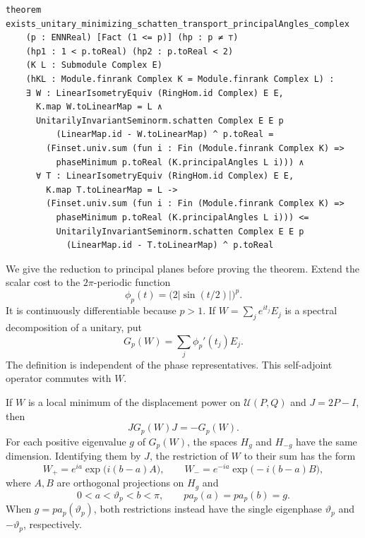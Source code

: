 \begin{lstlisting}[style=leanpaper,
 caption={Lean signature for the unrestricted Schatten minimum. The surrounding
 finite-dimensional complex Hilbert-space context is omitted. The parameter
 \texttt{p} is an extended nonnegative real; the hypotheses require its finite
 real value to lie in $(1,2)$. The scalar minimum is \texttt{phaseMinimum}.},
 label={lst:schatten-global}]
theorem exists_unitary_minimizing_schatten_transport_principalAngles_complex
    (p : ENNReal) [Fact (1 <= p)] (hp : p ≠ ⊤)
    (hp1 : 1 < p.toReal) (hp2 : p.toReal < 2)
    (K L : Submodule Complex E)
    (hKL : Module.finrank Complex K = Module.finrank Complex L) :
    ∃ W : LinearIsometryEquiv (RingHom.id Complex) E E,
      K.map W.toLinearMap = L ∧
      UnitarilyInvariantSeminorm.schatten Complex E E p
          (LinearMap.id - W.toLinearMap) ^ p.toReal =
        (Finset.univ.sum (fun i : Fin (Module.finrank Complex K) =>
          phaseMinimum p.toReal (K.principalAngles L i))) ∧
      ∀ T : LinearIsometryEquiv (RingHom.id Complex) E E,
        K.map T.toLinearMap = L ->
        (Finset.univ.sum (fun i : Fin (Module.finrank Complex K) =>
          phaseMinimum p.toReal (K.principalAngles L i))) <=
          UnitarilyInvariantSeminorm.schatten Complex E E p
            (LinearMap.id - T.toLinearMap) ^ p.toReal
\end{lstlisting}

We give the reduction to principal planes before proving the theorem.
Extend the scalar cost to the $2\pi$-periodic function
\[
 \phi_p(t)=\bigl(2|\sin(t/2)|\bigr)^p.
\]
It is continuously differentiable because $p>1$. If
$W=\sum_j e^{it_j}E_j$ is a spectral decomposition of a unitary, put
\[
 G_p(W)=\sum_j\phi_p'(t_j)E_j.
\]
The definition is independent of the phase representatives. This
self-adjoint operator commutes with $W$.

\begin{proposition}
\label{prop:schatten-critical-blocks}
If $W$ is a local minimum of the displacement power on $\mathcal U(P,Q)$ and
$J=2P-I$, then
\begin{equation}
 JG_p(W)J=-G_p(W).
 \label{eq:schatten-gradient-anticommutation}
\end{equation}
For each positive eigenvalue $g$ of $G_p(W)$, the spaces $H_g$ and
$H_{-g}$ have the same dimension. Identifying them by $J$, the restriction
of $W$ to their sum has the form
\begin{equation}
 W_+=e^{ia}\exp\bigl(i(b-a)A\bigr),\qquad
 W_-=e^{-ia}\exp\bigl(-i(b-a)B\bigr),
 \label{eq:schatten-critical-two-roots}
\end{equation}
where $A,B$ are orthogonal projections on $H_g$ and
\[
 0<a<\vartheta_p<b<\pi,\qquad p a_p(a)=p a_p(b)=g.
\]
When $g=p a_p(\vartheta_p)$, both restrictions instead have the single
eigenphase $\vartheta_p$ and $-\vartheta_p$, respectively.
\end{proposition}

